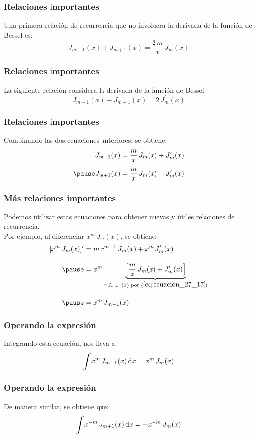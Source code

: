 \documentclass[12pt]{beamer}
\begin{document}
\begin{frame}
\frametitle{Relaciones importantes}
Una primera relación de recurrencia que no involucra la derivada de la función de Bessel es:
\pause
\begin{equation}
J_{m-1} (x) + J_{m+1} (x) = \dfrac{2 \, m}{x} \, J_{m} (x)
\label{eq:ecuacion_27_15}
\end{equation}
\end{frame}
\begin{frame}
\frametitle{Relaciones importantes}    
La siguiente relación considera la derivada de la función de Bessel:
\pause
\begin{equation}
J_{m-1} (x) - J_{m+1} (x) = 2 \, J_{m}^{\prime} (x)
\label{eq:ecuacion_27_16}
\end{equation}
\end{frame}
\begin{frame}
\frametitle{Relaciones importantes}    
Combinando las dos ecuaciones anteriores, se obtiene:
\pause
\begin{eqnarray}
\begin{aligned}
J_{m-1}(x) &= \dfrac{m}{x} \, J_{m} (x) + J_{m}^{\prime} (x) \\[0.5em] \pause
J_{m+1}(x) &= \dfrac{m}{x} \, J_{m} (x) - J_{m}^{\prime} (x)
\end{aligned}
\label{eq:ecuacion_27_17}
\end{eqnarray}
\end{frame}
\begin{frame}
\frametitle{Más relaciones importantes}    
Podemos utilizar estas ecuaciones para obtener nuevas y útiles relaciones de recurrencia.
\\
\bigskip
\pause
Por ejemplo, al diferenciar $x^{m} \, J_{m} (x)$, se obtiene:
\pause
\begin{eqnarray*}
\begin{aligned}
[x^{m} \, J_{m} (x)]^{\prime} &= m \, x^{m-1} \, J_{m} (x) + x^{m} \, J_{m}^{\prime} (x) \\[1em] \pause
&= x^{m} \underbrace{ \left[ \dfrac{m}{x} \, J_{m} (x) + J_{m}^{\prime} (x)\right]}_{=J_{m-1}(x) \text{ por } (\ref{eq:ecuacion_27_17})}  \\[1em] \pause
&= x^{m} \, J_{m-1} (x)
\end{aligned}
\end{eqnarray*}
\end{frame}
\begin{frame}
\frametitle{Operando la expresión}    
Integrando esta ecuación, nos lleva a:
\pause
\begin{equation}
\scaleint{6ex} x^{m} \, J_{m-1} (x) \dd{x} = x^{m} \, J_{m} (x)
\label{eq:ecuacion_27_18}
\end{equation}
\end{frame}
\begin{frame}
\frametitle{Operando la expresión}    
De manera similar, se obtiene que:
\pause
\begin{equation}
\scaleint{6ex} x^{-m} \, J_{m+1} (x) \dd{x} = -x^{-m} \, J_{m} (x)
\label{eq:ecuacion_27_19}
\end{equation}
\end{frame}
\end{document}

